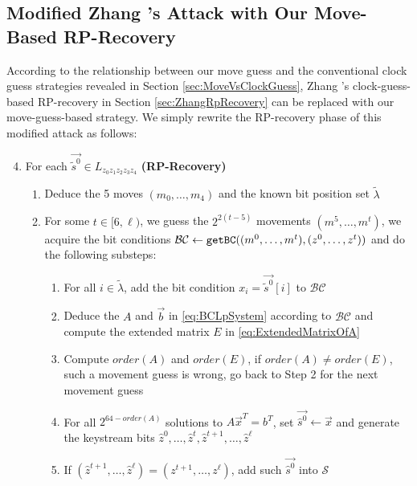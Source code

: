 \subsection{Modified Zhang \etal's Attack with Our Move-Based RP-Recovery}\label{sec:OurRpRecovery}
According to the relationship between our move guess and the conventional clock guess strategies revealed in Section \ref{sec:MoveVsClockGuess}, Zhang \etal's clock-guess-based RP-recovery in Section \ref{sec:ZhangRpRecovery} can be replaced with our move-guess-based strategy. 
We simply rewrite the RP-recovery phase of this modified attack as follows:
\begin{enumerate}
\setcounter{enumi}{3} 
   \item For each $\vec{\tilde{s}^0}\in L_{z_0z_1z_2z_3z_4}$ \textbf{(RP-Recovery)}
   \begin{enumerate}
     \item Deduce the 5 moves $(m_0,\ldots, m_4)$ and the known bit position set $\tilde{\lambda}$
     \item For some $t \in [6,\ell)$, we guess the $2^{2(t-5)}$ movements $(m^5,\ldots, m^t)$, we acquire the bit conditions $\mathcal{BC}\leftarrow {\tt getBC}((m^0,\ldots, m^t), (z^0,\ldots, z^t))$ and do the following substeps:
     \begin{enumerate}
        \item For all $i\in \tilde{\lambda}$, add the bit condition $x_i=\vec{\tilde{s}^0}[i]$ to $\mathcal{BC}$
        \item Deduce the $A$ and $\vec b$ in \eqref{eq:BCLpSystem} according to $\mathcal{BC}$ and compute the extended matrix $E$ in \eqref{eq:ExtendedMatrixOfA}
        \item Compute $order(A)$ and $order(E)$, if $order(A)\neq order(E)$, such a movement guess is wrong, go back to Step 2 for the next movement guess
        \item For all $2^{64-order(A)}$ solutions to $A\vec x^T=b^T$, set $\vec{\hat{s}^0}\leftarrow \vec x$ and generate the keystream bits $\hat{z}^0,\ldots, \hat{z}^t,\hat{z}^{t+1},\ldots, \hat{z}^{\ell}$
        \item If $(\hat{z}^{t+1},\ldots, \hat{z}^{\ell})=(z^{t+1},\ldots, z^{\ell})$, add such $\vec{\hat{s}^0}$ into $\mathcal{S}$
      \end{enumerate}
   \end{enumerate}
\end{enumerate}

